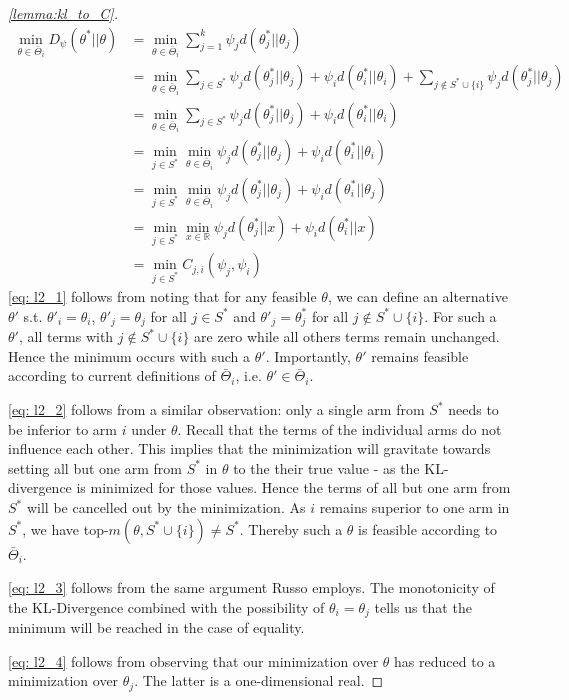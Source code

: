 \begin{proof}[\ref{lemma:kl_to_C}]
  \begin{align}
    \min_{\theta \in \bar{\Theta}_i} D_\psi(\theta^*||\theta) &= \min_{\theta \in \bar{\Theta}_i} \sum_{j=1}^k \psi_j d(\theta^*_j||\theta_j)\\
    &= \min_{\theta \in \bar{\Theta}_i} \sum_{j\in S^*} \psi_{j}d(\theta^*_{j} || \theta_{j}) + \psi_{i}d(\theta_{i}^* || \theta_{i}) + \sum_{j \notin S^* \cup \{i\}} \psi_j d(\theta^*_j||\theta_j) \\
    &= \min_{\theta \in \bar{\Theta}_i} \sum_{j\in S^*} \psi_{j}d(\theta^*_{j} || \theta_{j}) + \psi_{i}d(\theta_{i}^* || \theta_{i}) \label{eq: l2_1}\\
    &= \min_{j\in S^*} \min_{\theta \in \bar{\Theta}_i} \psi_{j}d(\theta^*_{j} || \theta_{j}) + \psi_{i}d(\theta_{i}^* || \theta_{i}) \label{eq: l2_2}\\
    &= \min_{j\in S^*} \min_{\theta \in \bar{\Theta}_i} \psi_{j}d(\theta^*_{j} || \theta_{j}) + \psi_{i}d(\theta_{i}^* || \theta_{j}) \label{eq: l2_3}\\
    &= \min_{j\in S^*} \min_{x \in \mathbb{R}} \psi_{j}d(\theta^*_{j} || x) + \psi_{i}d(\theta_{i}^* ||x) \label{eq: l2_4}\\
    &= \min_{j \in S^*} C_{j, i}(\psi_j, \psi_i)
  \end{align}
  \eqref{eq: l2_1} follows from noting that for any feasible $\theta$, we can define an alternative $\theta'$ s.t. $\theta'_i = \theta_i$, $\theta'_j = \theta_j$ for all $j \in S^*$ and $\theta'_j = \theta^*_j$ for all $j \notin S^* \cup \{i\}$. For such a $\theta'$, all terms with $j \notin S^* \cup \{i\}$ are zero while all others terms remain unchanged. Hence the minimum occurs with such a $\theta'$. Importantly, $\theta'$ remains feasible according to current definitions of $\bar{\Theta}_i$, i.e. $\theta' \in \bar{\Theta}_i$.

  \eqref{eq: l2_2} follows from a similar observation: only a single arm from $S^*$ needs to be inferior to arm $i$ under $\theta$. Recall that the terms of the individual arms do not influence each other. This implies that the minimization will gravitate towards setting all but one arm from $S^*$ in $\theta$ to the their true value - as the KL-divergence is minimized for those values. Hence the terms of all but one arm from $S^*$ will be cancelled out by the minimization. As $i$ remains superior to one arm in $S^*$, we have top-$m(\theta, S^* \cup \{i\}) \neq S^*$. Thereby such a $\theta$ is feasible according to $\bar{\Theta}_i$.

  \eqref{eq: l2_3} follows from the same argument Russo employs. The monotonicity of the KL-Divergence combined with the possibility of $\theta_i = \theta_j$ tells us that the minimum will be reached in the case of equality.

  \eqref{eq: l2_4} follows from observing that our minimization over $\theta$ has reduced to a minimization over $\theta_j$. The latter is a one-dimensional real.
\end{proof}

